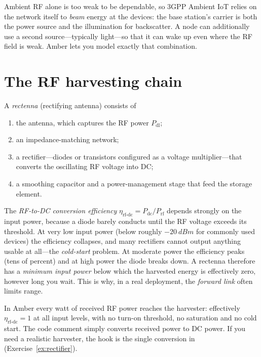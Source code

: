 Ambient RF alone is too weak to be dependable, so 3GPP Ambient IoT relies on
the network itself to \emph{beam} energy at the devices: the base station's carrier
is both the power source and the illumination for backscatter. A node can
additionally use a second source---typically light---so that it can wake up even
where the RF field is weak. Amber lets you model exactly that combination.

\section{The RF harvesting chain}
\label{sec:rectenna}

A \emph{rectenna} (rectifying antenna) consists of
\begin{enumerate}
 \item the antenna, which captures the RF power $P_{\mathrm{dl}}$;
 \item an impedance-matching network;
 \item a rectifier---diodes or transistors configured as a voltage multiplier---that converts the oscillating RF voltage into DC;
 \item a smoothing capacitor and a power-management stage that feed the storage element.
\end{enumerate}
The \emph{RF-to-DC conversion efficiency} $\eta_{\mathrm{rf\text{-}dc}}=P_{\mathrm{dc}}/P_{\mathrm{rf}}$
depends strongly on the input power, because a diode barely conducts until the
RF voltage exceeds its threshold. At very low input power (below roughly
$\SI{-20}{dBm}$ for commonly used devices) the efficiency collapses, and many
rectifiers cannot output anything usable at all---the \emph{cold-start}
problem. At moderate power the efficiency peaks (tens of percent) and at high
power the diode breaks down. A rectenna therefore has a \emph{minimum input power}
below which the harvested energy is effectively zero, however long you wait.
This is why, in a real deployment, the \emph{forward link} often limits range.

\begin{reality}
In Amber every watt of received RF power reaches the harvester: effectively
$\eta_{\mathrm{rf\text{-}dc}}=1$ at all input levels, with no turn-on threshold,
no saturation and no cold start. The code comment simply converts received
power to DC power. If you need a realistic harvester, the hook is the single
conversion in  (Exercise~\ref{ex:rectifier}).
\end{reality}

